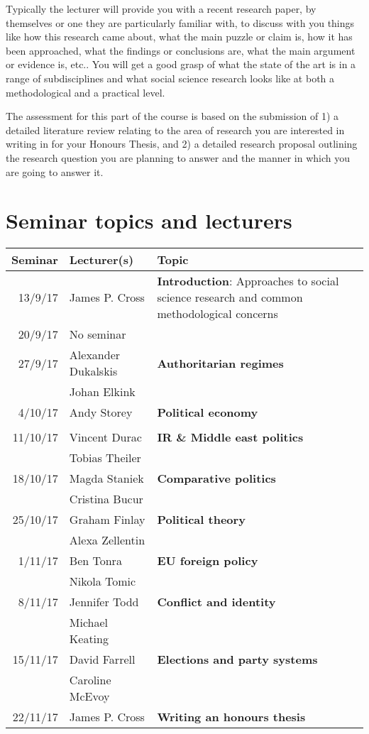 \documentclass[a4paper,12pt]{article}
\begin{document}
	Typically the lecturer will provide you with a recent research paper, by themselves or one they are particularly familiar with, to discuss with you things like how this research came about, what the main puzzle or claim is, how it has been approached, what the findings or conclusions are, what the main argument or evidence is, etc.. You will get a good grasp of what the state of the art is in a range of subdisciplines and what social science research looks like at both a methodological and a practical level.
	
	The assessment for this part of the course is based on the submission of 1) a detailed literature review relating to the area of research you are interested in writing in for your Honours Thesis, and 2) a detailed research proposal outlining the research question you are planning to answer and the manner in which you are going to answer it.
	

\section*{Seminar topics and lecturers}

\begin{table}[ht]
	\centering
	\begin{tabular}{|r|l|p{}|}
	\hline
	Seminar & Lecturer(s) & Topic \\
	\hline
	13/9/17 & James P. Cross & {\bf Introduction}: Approaches to social science research and common methodological concerns \\
	\hline
	20/9/17 & No seminar & \\
	\hline
	27/9/17 & Alexander Dukalskis & {\bf Authoritarian regimes} \\
	& Johan Elkink & \\
	\hline
	4/10/17 & Andy Storey & {\bf Political economy} \\
	&  & \\
	\hline
	11/10/17 & Vincent Durac & {\bf IR \& Middle east politics} \\
	& Tobias Theiler & \\
	\hline
	18/10/17 & Magda Staniek & {\bf Comparative politics} \\
	& Cristina Bucur & \\
	\hline
	25/10/17 & Graham Finlay & {\bf Political theory} \\
	& Alexa Zellentin & \\
	\hline
	1/11/17 & Ben Tonra & {\bf EU foreign policy} \\
	& Nikola Tomic & \\
	\hline
	8/11/17 & Jennifer Todd &  {\bf Conflict and identity} \\
	& Michael Keating & \\
	\hline
	15/11/17 & David Farrell & {\bf Elections and party systems} \\
	& Caroline McEvoy & \\
	\hline
	22/11/17 & James P. Cross & {\bf Writing an honours thesis}\\
	\hline
	\end{tabular}
\end{table}
\end{document}
